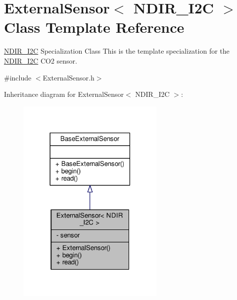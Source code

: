 \hypertarget{class_external_sensor_3_01_n_d_i_r___i2_c_01_4}{}\section{External\+Sensor$<$ N\+D\+I\+R\+\_\+\+I2C $>$ Class Template Reference}
\label{class_external_sensor_3_01_n_d_i_r___i2_c_01_4}


\hyperlink{class_n_d_i_r___i2_c}{N\+D\+I\+R\+\_\+\+I2C} Specialization Class This is the template specialization for the \hyperlink{class_n_d_i_r___i2_c}{N\+D\+I\+R\+\_\+\+I2C} C\+O2 sensor.  




{\ttfamily \#include $<$External\+Sensor.\+h$>$}



Inheritance diagram for External\+Sensor$<$ N\+D\+I\+R\+\_\+\+I2C $>$\+:\nopagebreak
\begin{figure}[H]
\begin{center}
\leavevmode
\includegraphics[width=201pt]{d0/d1b/class_external_sensor_3_01_n_d_i_r___i2_c_01_4__inherit__graph}
\end{center}
\end{figure}



